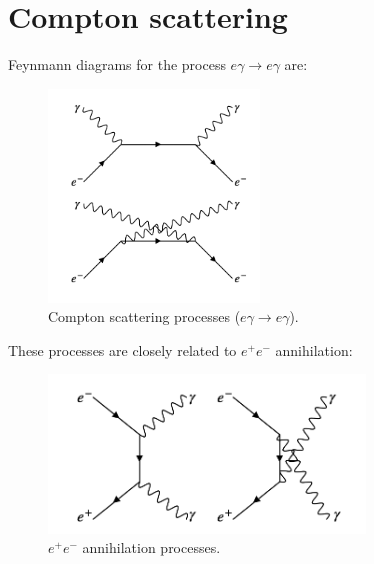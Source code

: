 
\chapter{Compton scattering}

Feynmann diagrams for the process $e\gamma \to e\gamma$ are:

\begin{figure}[!htb]
  \begin{center}
    \includegraphics[width=0.5\textwidth]{images/web_feynman/image_36.png}
    \caption[Compton scattering processes]{Compton scattering processes ($e\gamma\to e\gamma$).}
    \label{fig:ch11_Compton}
  \end{center}
\end{figure}

These processes are closely related to $e^+e^-$ annihilation:

\begin{figure}[!htb]
  \begin{center}
    \includegraphics[width=0.75\textwidth]{images/web_feynman/image_37.png}
    \caption[$e^+e^-$ annihilation processes]{$e^+e^-$ annihilation processes.}
    \label{fig:ch11_EpemToGGc}
  \end{center}
\end{figure}

